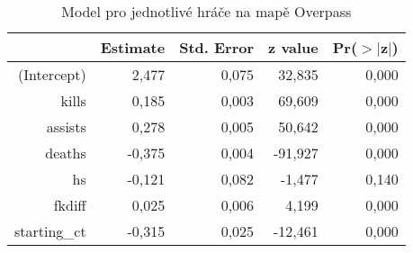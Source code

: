 \begin{table}[H]
\centering
\begin{tabular}{rrrrr}
  \hline
 & Estimate & Std. Error & z value & Pr($>$$|$z$|$) \\ 
  \hline
(Intercept) & 2,477 & 0,075 & 32,835 & 0,000 \\ 
  kills & 0,185 & 0,003 & 69,609 & 0,000 \\ 
  assists & 0,278 & 0,005 & 50,642 & 0,000 \\ 
  deaths & -0,375 & 0,004 & -91,927 & 0,000 \\ 
  hs & -0,121 & 0,082 & -1,477 & 0,140 \\ 
  fkdiff & 0,025 & 0,006 & 4,199 & 0,000 \\ 
  starting\_ct & -0,315 & 0,025 & -12,461 & 0,000 \\ 
   \hline
\end{tabular}
\caption{\label{tab:player_model_Overpass}Model pro jednotlivé hráče na mapě Overpass} 
\end{table}
